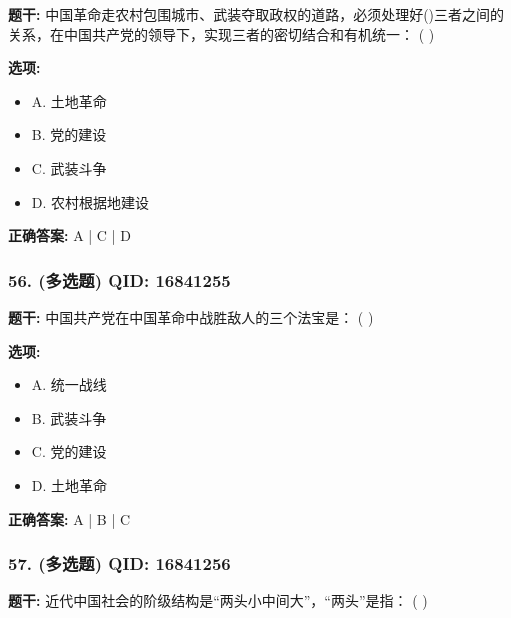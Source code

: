 \documentclass[12pt,UTF8]{ctexart}
\begin{document}
\textbf{题干:}
中国革命走农村包围城市、武装夺取政权的道路，必须处理好()三者之间的关系，在中国共产党的领导下，实现三者的密切结合和有机统一： ( )

\textbf{选项:}
\begin{itemize}[leftmargin=*]

  \item A. 土地革命

  \item B. 党的建设

  \item C. 武装斗争

  \item D. 农村根据地建设

\end{itemize}

\textbf{正确答案:}
A | C | D

\vspace{0.3em}\hrulefill\vspace{0.7em}

\subsubsection*{56. (多选题) \small QID: 16841255}

\textbf{题干:}
中国共产党在中国革命中战胜敌人的三个法宝是： ( )

\textbf{选项:}
\begin{itemize}[leftmargin=*]

  \item A. 统一战线

  \item B. 武装斗争

  \item C. 党的建设

  \item D. 土地革命

\end{itemize}

\textbf{正确答案:}
A | B | C

\vspace{0.3em}\hrulefill\vspace{0.7em}

\subsubsection*{57. (多选题) \small QID: 16841256}

\textbf{题干:}
近代中国社会的阶级结构是“两头小中间大”，“两头”是指： ( )
\end{document}

